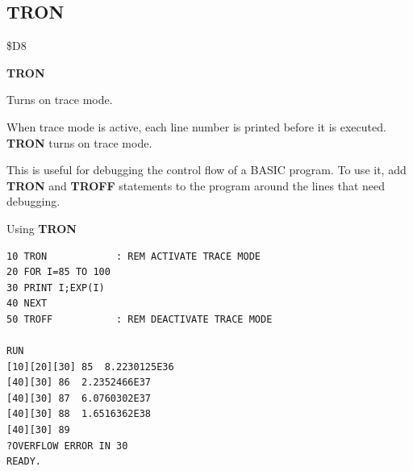 \subsection{TRON}
\begin{description}[leftmargin=2cm,style=nextline]
\item [Token:]    \$D8

\item [Format:]   {\bf TRON}

\item [Usage:]    Turns on trace mode.

                  When trace mode is active, each line number is printed before it is executed. {\bf TRON} turns on trace mode.

                  This is useful for debugging the control flow of a BASIC program. To use it, add {\bf TRON} and {\bf TROFF} statements to the program around the lines that need debugging.

\item [Example:]  Using {\bf TRON}

\begin{tcolorbox}[colback=black,coltext=white]
\verbatimfont{\codefont}
\begin{verbatim}
10 TRON            : REM ACTIVATE TRACE MODE
20 FOR I=85 TO 100
30 PRINT I;EXP(I)
40 NEXT
50 TROFF           : REM DEACTIVATE TRACE MODE

RUN
[10][20][30] 85  8.2230125E36
[40][30] 86  2.2352466E37
[40][30] 87  6.0760302E37
[40][30] 88  1.6516362E38
[40][30] 89
?OVERFLOW ERROR IN 30
READY.
\end{verbatim}
\end{tcolorbox}
\end{description}


\newpage
